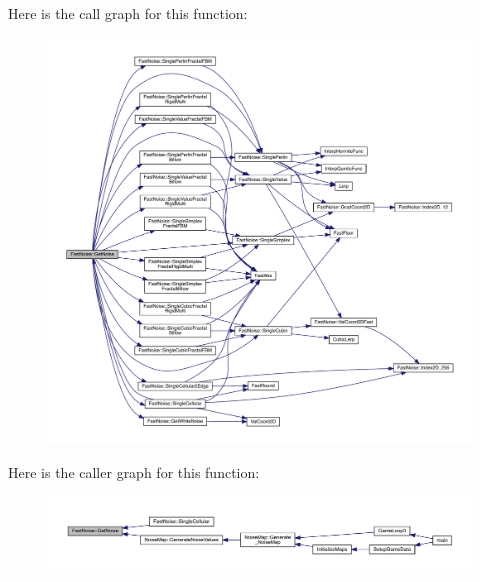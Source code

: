 Here is the call graph for this function\+:
\nopagebreak
\begin{figure}[H]
\begin{center}
\leavevmode
\includegraphics[width=350pt]{d1/dd8/class_fast_noise_a61722acaa5692a40ee939d578b6a40d1_cgraph}
\end{center}
\end{figure}
Here is the caller graph for this function\+:
\nopagebreak
\begin{figure}[H]
\begin{center}
\leavevmode
\includegraphics[width=350pt]{d1/dd8/class_fast_noise_a61722acaa5692a40ee939d578b6a40d1_icgraph}
\end{center}
\end{figure}
\mbox{\label{class_fast_noise_a0d9b7a6858a599cde4dc5b8f74264ae0}} 
